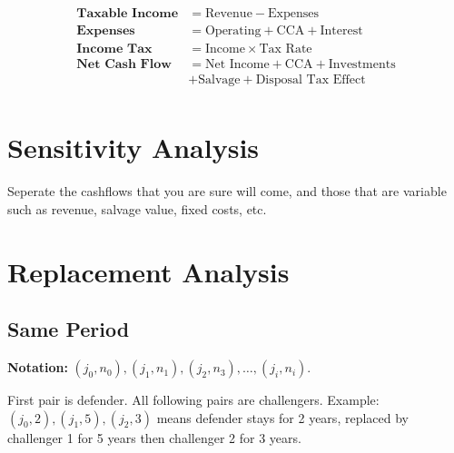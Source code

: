 \documentclass[landscape, letterpaper, 10pt]{article}
\begin{document}
\begin{multicols}{3}
    \begin{align*}
        \textbf{Taxable Income} & = \text{Revenue} - \text{Expenses}                   \\
        \textbf{Expenses}       & =  \text{Operating} + \text{CCA} + \text{Interest}   \\
        \textbf{Income Tax}     & = \text{Income} \times \text{Tax Rate}               \\
        \textbf{Net Cash Flow}  & = \text{Net Income} + \text{CCA} +\text{Investments} \\
                                & +\text{Salvage} +\text{Disposal Tax Effect}          \\
    \end{align*}

    \section*{Sensitivity Analysis}
    Seperate the cashflows that you are sure will come, and those that are variable such as revenue, salvage value, fixed costs, etc.
    \section*{Replacement Analysis}
    \subsection*{Same Period}
    \textbf{Notation:} $(j_0, n_0), (j_1, n_1), (j_2, n_3), \ldots, (j_i, n_i)$.

    First pair is defender. All following pairs are challengers. Example: $(j_0, 2), (j_1, 5), (j_2, 3)$ means defender stays for 2 years, replaced by challenger 1 for 5 years then challenger 2 for 3 years.


\end{multicols}
\end{document}
